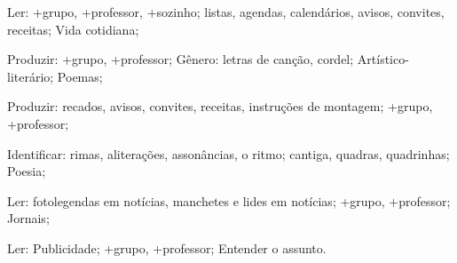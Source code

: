  Ler: +grupo, +professor, +sozinho; listas, agendas, calendários, avisos, convites, receitas; Vida cotidiana;

 Produzir: +grupo, +professor; Gênero: letras de canção, cordel; Artístico-literário; Poemas;

 Produzir: recados, avisos, convites, receitas, instruções de montagem; +grupo, +professor;

 Identificar: rimas, aliterações, assonâncias, o ritmo; cantiga, quadras, quadrinhas; Poesia;

 Ler: fotolegendas em notícias, manchetes e lides em notícias; +grupo, +professor; Jornais;

 Ler: Publicidade; +grupo, +professor; Entender o assunto.

